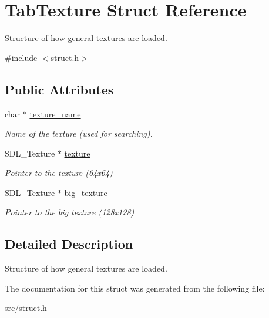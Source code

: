 \hypertarget{struct_tab_texture}{}\section{Tab\+Texture Struct Reference}
\label{struct_tab_texture}


Structure of how general textures are loaded.  




{\ttfamily \#include $<$struct.\+h$>$}

\subsection*{Public Attributes}
\begin{DoxyCompactItemize}
\item 
\mbox{\label{struct_tab_texture_aad2fb8256a5b811ab65bb70fc989b462}} 
char $\ast$ \hyperlink{struct_tab_texture_aad2fb8256a5b811ab65bb70fc989b462}{texture\+\_\+name}
\begin{DoxyCompactList}\small\item\em Name of the texture (used for searching). \end{DoxyCompactList}\item 
\mbox{\label{struct_tab_texture_aa6734702e2a8b224d5b9410408d1f1fe}} 
S\+D\+L\+\_\+\+Texture $\ast$ \hyperlink{struct_tab_texture_aa6734702e2a8b224d5b9410408d1f1fe}{texture}
\begin{DoxyCompactList}\small\item\em Pointer to the texture (64x64) \end{DoxyCompactList}\item 
\mbox{\label{struct_tab_texture_a41419e26e77a5616b64b5e7acdbb0d20}} 
S\+D\+L\+\_\+\+Texture $\ast$ \hyperlink{struct_tab_texture_a41419e26e77a5616b64b5e7acdbb0d20}{big\+\_\+texture}
\begin{DoxyCompactList}\small\item\em Pointer to the big texture (128x128) \end{DoxyCompactList}\end{DoxyCompactItemize}


\subsection{Detailed Description}
Structure of how general textures are loaded. 

The documentation for this struct was generated from the following file\+:\begin{DoxyCompactItemize}
\item 
src/\hyperlink{struct_8h}{struct.\+h}\end{DoxyCompactItemize}
